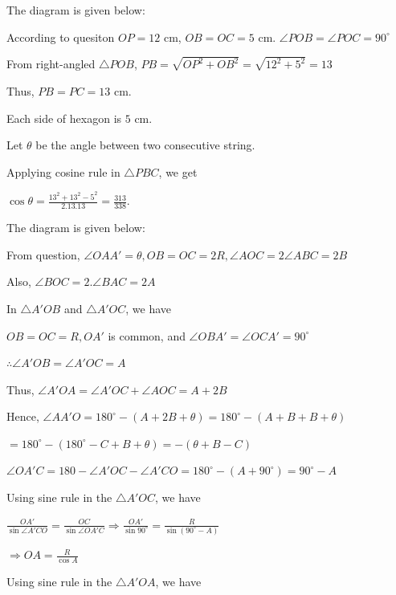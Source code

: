   The diagram is given below:

  \startplacefigure
    \externalfigure[17_3.pdf]
  \stopplacefigure

  According to quesiton $OP = 12$ cm, $OB = OC = 5$ cm. $\angle POB = \angle POC = 90^\circ$

  From right-angled $\triangle POB$, $PB = \sqrt{OP^2 + OB^2} = \sqrt{12^2 + 5^2} = 13$

  Thus, $PB = PC = 13$ cm.

  Each side of hexagon is $5$ cm.

  Let $\theta$ be the angle between two consecutive string.

  \startplacefigure
    \externalfigure[17_3_1.pdf]
  \stopplacefigure

  Applying cosine rule in $\triangle PBC$, we get

  $\cos\theta = \frac{13^2 + 13^2 - 5^2}{2.13.13} = \frac{313}{338}$.
\item The diagram is given below:

  \startplacefigure
    \externalfigure[17_4.pdf]
  \stopplacefigure

  From question, $\angle OAA' = \theta, OB = OC = 2R, \angle AOC = 2\angle ABC = 2B$

  Also, $\angle BOC = 2.\angle BAC = 2A$

  In $\triangle A'OB$ and $\triangle A'OC$, we have

  $OB = OC = R, OA'$ is common, and $\angle OBA' = \angle OCA' = 90^\circ$

  $\therefore \angle A'OB = \angle A'OC = A$

  Thus, $\angle A'OA = \angle A'OC + \angle AOC = A + 2B$

  Hence, $\angle AA'O = 180^\circ - (A + 2B + \theta) = 180^\circ - (A + B + B + \theta)$

  $= 180^\circ - \left(180^\circ - C + B + \theta\right) = -(\theta + B - C)$

  $\angle OA'C = 180 - \angle A'OC - \angle A'CO = 180^\circ - (A + 90^\circ) = 90^\circ - A$

  Using sine rule in the $\triangle A'OC$, we have

  $\frac{OA'}{\sin\angle A'CO} = \frac{OC}{\sin\angle OA'C} \Rightarrow \frac{OA'}{\sin90^\circ}
  = \frac{R}{\sin\left(90^\circ - A\right)}$

  $\Rightarrow OA = \frac{R}{\cos A}$

  Using sine rule in the $\triangle A'OA$, we have

